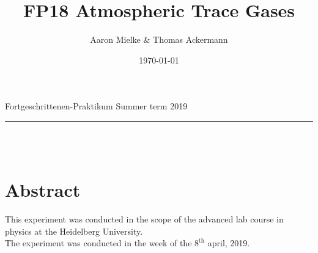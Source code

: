\documentclass[12pt, a4paper, bibliography=totoc]{scrartcl}
\title{FP18 Atmospheric Trace Gases}
\author{Aaron Mielke \& Thomas Ackermann}
\date{\today}
\begin{document}
\begin{center}
	\makeatletter
	\thispagestyle{empty}
	\large{Fortgeschrittenen-Praktikum}	
	\hfill
    \large{Summer term 2019}
    \vspace{5mm}
	\rule{\textwidth}{0.2pt}
    \vfill
	\Huge\textbf{\@title} \\
	\vspace{10mm}
	\large{\@author} \\
	\normalfont
	\vfill	
	\makeatother
\end{center}

\normalsize
\newpage

\section*{Abstract}
This experiment was conducted in the scope of the advanced lab course in physics at the Heidelberg University. \\
The experiment was conducted in the week of the $8^\text{th}$ april, 2019.
\end{document}
